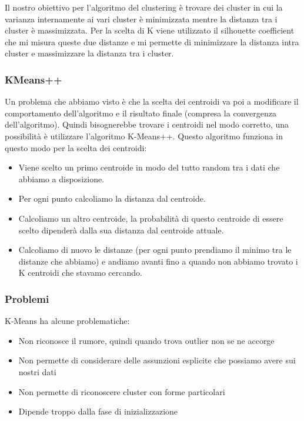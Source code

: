 \documentclass[14pt]{extreport}
\begin{document}
Il nostro obiettivo per l'algoritmo del clustering è trovare dei cluster in cui la varianza internamente ai vari cluster è minimizzata mentre la
distanza tra i cluster è massimizzata. Per la scelta di K viene utilizzato il silhouette coefficient che mi misura queste due distanze e mi permette
di minimizzare la distanza intra cluster e massimizzare la distanza tra i cluster.

\subsubsection{KMeans++}

Un problema che abbiamo visto è che la scelta dei centroidi va poi a modificare il comportamento dell'algoritmo e il risultato finale (compresa la
convergenza dell'algoritmo). Quindi bisognerebbe trovare i centroidi nel modo corretto, una possibilità è utilizzare l'algoritmo K-Means++. Questo
algoritmo funziona in questo modo per la scelta dei centroidi:
\begin{itemize}
	\item Viene scelto un primo centroide in modo del tutto random tra i dati che abbiamo a disposizione.
	\item Per ogni punto calcoliamo la distanza dal centroide.
	\item Calcoliamo un altro centroide, la probabilità di questo centroide di essere scelto dipenderà dalla sua distanza dal centroide attuale.
	\item Calcoliamo di nuovo le distanze (per ogni punto prendiamo il minimo tra le distanze che abbiamo) e andiamo avanti fino a quando non abbiamo
	trovato i K centroidi che stavamo cercando.
\end{itemize}

\subsubsection{Problemi}

K-Means ha alcune problematiche:
\begin{itemize}
	\item Non riconosce il rumore, quindi quando trova outlier non se ne accorge
	\item Non permette di considerare delle assunzioni esplicite che possiamo avere sui nostri dati
	\item Non permette di riconoscere cluster con forme particolari
	\item Dipende troppo dalla fase di inizializzazione
\end{itemize}
\end{document}
